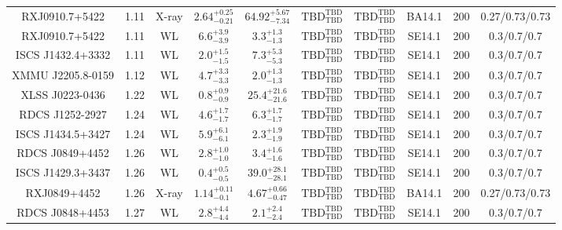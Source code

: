 \begin{table}
\begin{tabular}{cccccccccc}
RXJ0910.7+5422 & 1.11 & X-ray & ${2.64}^{+0.25}_{-0.21}$ & ${64.92}^{+5.67}_{-7.34}$ & ${\mathrm{TBD}}^{\mathrm{TBD}}_{\mathrm{TBD}}$ & ${\mathrm{TBD}}^{\mathrm{TBD}}_{\mathrm{TBD}}$ & BA14.1 & 200 & 0.27/0.73/0.73 \\
RXJ0910.7+5422 & 1.11 & WL & ${6.6}^{+3.9}_{-3.9}$ & ${3.3}^{+1.3}_{-1.3}$ & ${\mathrm{TBD}}^{\mathrm{TBD}}_{\mathrm{TBD}}$ & ${\mathrm{TBD}}^{\mathrm{TBD}}_{\mathrm{TBD}}$ & SE14.1 & 200 & 0.3/0.7/0.7 \\
ISCS J1432.4+3332 & 1.11 & WL & ${2.0}^{+1.5}_{-1.5}$ & ${7.3}^{+5.3}_{-5.3}$ & ${\mathrm{TBD}}^{\mathrm{TBD}}_{\mathrm{TBD}}$ & ${\mathrm{TBD}}^{\mathrm{TBD}}_{\mathrm{TBD}}$ & SE14.1 & 200 & 0.3/0.7/0.7 \\
XMMU J2205.8-0159 & 1.12 & WL & ${4.7}^{+3.3}_{-3.3}$ & ${2.0}^{+1.3}_{-1.3}$ & ${\mathrm{TBD}}^{\mathrm{TBD}}_{\mathrm{TBD}}$ & ${\mathrm{TBD}}^{\mathrm{TBD}}_{\mathrm{TBD}}$ & SE14.1 & 200 & 0.3/0.7/0.7 \\
XLSS J0223-0436 & 1.22 & WL & ${0.8}^{+0.9}_{-0.9}$ & ${25.4}^{+21.6}_{-21.6}$ & ${\mathrm{TBD}}^{\mathrm{TBD}}_{\mathrm{TBD}}$ & ${\mathrm{TBD}}^{\mathrm{TBD}}_{\mathrm{TBD}}$ & SE14.1 & 200 & 0.3/0.7/0.7 \\
RDCS J1252-2927 & 1.24 & WL & ${4.6}^{+1.7}_{-1.7}$ & ${6.3}^{+1.7}_{-1.7}$ & ${\mathrm{TBD}}^{\mathrm{TBD}}_{\mathrm{TBD}}$ & ${\mathrm{TBD}}^{\mathrm{TBD}}_{\mathrm{TBD}}$ & SE14.1 & 200 & 0.3/0.7/0.7 \\
ISCS J1434.5+3427 & 1.24 & WL & ${5.9}^{+6.1}_{-6.1}$ & ${2.3}^{+1.9}_{-1.9}$ & ${\mathrm{TBD}}^{\mathrm{TBD}}_{\mathrm{TBD}}$ & ${\mathrm{TBD}}^{\mathrm{TBD}}_{\mathrm{TBD}}$ & SE14.1 & 200 & 0.3/0.7/0.7 \\
RDCS J0849+4452 & 1.26 & WL & ${2.8}^{+1.0}_{-1.0}$ & ${3.4}^{+1.6}_{-1.6}$ & ${\mathrm{TBD}}^{\mathrm{TBD}}_{\mathrm{TBD}}$ & ${\mathrm{TBD}}^{\mathrm{TBD}}_{\mathrm{TBD}}$ & SE14.1 & 200 & 0.3/0.7/0.7 \\
ISCS J1429.3+3437 & 1.26 & WL & ${0.4}^{+0.5}_{-0.5}$ & ${39.0}^{+28.1}_{-28.1}$ & ${\mathrm{TBD}}^{\mathrm{TBD}}_{\mathrm{TBD}}$ & ${\mathrm{TBD}}^{\mathrm{TBD}}_{\mathrm{TBD}}$ & SE14.1 & 200 & 0.3/0.7/0.7 \\
RXJ0849+4452 & 1.26 & X-ray & ${1.14}^{+0.11}_{-0.1}$ & ${4.67}^{+0.66}_{-0.47}$ & ${\mathrm{TBD}}^{\mathrm{TBD}}_{\mathrm{TBD}}$ & ${\mathrm{TBD}}^{\mathrm{TBD}}_{\mathrm{TBD}}$ & BA14.1 & 200 & 0.27/0.73/0.73 \\
RDCS J0848+4453 & 1.27 & WL & ${2.8}^{+4.4}_{-4.4}$ & ${2.1}^{+2.4}_{-2.4}$ & ${\mathrm{TBD}}^{\mathrm{TBD}}_{\mathrm{TBD}}$ & ${\mathrm{TBD}}^{\mathrm{TBD}}_{\mathrm{TBD}}$ & SE14.1 & 200 & 0.3/0.7/0.7 \\

\end{tabular}
\end{table}
